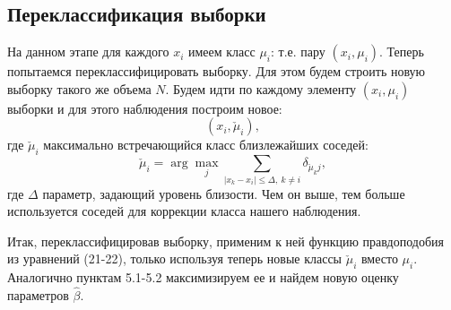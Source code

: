 \documentclass[12pt]{article}
\begin{document}
\subsection{Переклассификация выборки}
На данном этапе для каждого $x_i$ имеем класс $\mu_i$: т.е. пару $(x_i,\mu_i)$.
Теперь попытаемся переклассифицировать выборку. 
Для этом будем строить новую выборку такого же объема $N$.
Будем идти по каждому элементу $(x_i, \mu_i)$ выборки и для этого наблюдения построим новое:
\begin{equation}
    (x_i, \check{\mu}_i),
\end{equation}
где $\check{\mu}_i$ максимально встречающийся класс близлежайших соседей:
\begin{equation}
    \check{\mu}_i = \arg\max_j \sum_{|x_k-x_i|\leq \Delta,~k\neq i} \delta_{\check{\mu}_k j},
\end{equation}
где $\Delta$ параметр, задающий уровень близости. Чем он выше, тем больше используется соседей для коррекции класса нашего наблюдения.

Итак, переклассифицировав выборку, применим к ней функцию правдоподобия из уравнений (21-22), только используя теперь новые классы $\check{\mu}_i$ вместо $\mu_i$. 
Аналогично пунктам 5.1-5.2 максимизируем ее и найдем новую оценку параметров $\hat{\beta}$.
\end{document}

